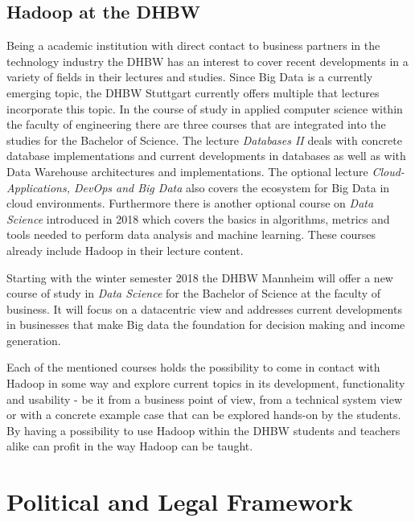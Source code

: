\subsection{Hadoop at the DHBW}

Being a academic institution with direct contact to 
business partners in the technology industry the \ac{DHBW} has an interest to cover recent developments in a variety of fields in their lectures and studies.
Since Big Data is a currently emerging topic,
the \ac{DHBW} Stuttgart currently offers multiple that lectures incorporate this topic.
In the course of study in applied computer science within the faculty of engineering there are three courses that are integrated into the studies for the Bachelor of Science.
The lecture \emph{Databases II} deals with concrete database implementations and current developments in databases as well as with Data Warehouse architectures and implementations.
\autocite[][]{DHBW2017aidbii}
The optional lecture \emph{Cloud-Applications, DevOps and Big Data} also covers the ecosystem for Big Data in cloud environments. \autocite[][]{DHBW2017aiwf}
Furthermore there is another optional course on \emph{Data Science} introduced in 2018 which covers the basics in algorithms, metrics and tools needed to perform data analysis and machine learning.
These courses already include Hadoop in their lecture content.

Starting with the winter semester 2018 the \ac{DHBW} Mannheim will offer a new course of study in \emph{Data Science} for the Bachelor of Science at the faculty of business.
It will focus on a datacentric view and addresses current developments in businesses that make Big data the foundation for decision making and income generation.
\autocite[][]{DHBW2018mannheimdatascience}

Each of the mentioned courses holds the possibility to come in contact with Hadoop in some way and explore current topics in its development, functionality and usability - be it from a business point of view, from a technical system view or with a concrete example case that can be explored hands-on by the students.
By having a possibility to use Hadoop within the \ac{DHBW} students and teachers alike can profit in the way Hadoop can be taught.

\section{Political and Legal Framework}
\label{sec:fund:legal}
\label{sota-pol-legal}

